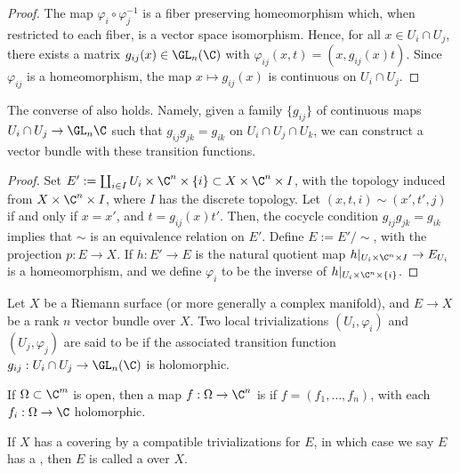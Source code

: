 \documentclass[11pt]{report}
\begin{document}
\begin{proof}
    The map $\varphi_i \circ \varphi_j^{-1}$ is a fiber preserving homeomorphism which, when restricted to each fiber, is a vector space isomorphism. Hence, for all $x \in U_i \cap U_j$, there exists a matrix $g_{ij}(x) \in \GL_n(\C)$ with $\varphi_{ij}(x,t)=(x,g_{ij}(x)t)$. Since $\varphi_{ij}$ is a homeomorphism, the map $x \mapsto g_{ij}(x)$ is continuous on $U_i \cap U_j$.
\end{proof}

\begin{rmk}
    The converse of  also holds. Namely, given a family $\{g_{ij}\}$ of continuous maps $U_i \cap U_j \to \GL_{n}\C$ such that $g_{ij}g_{jk}=g_{ik}$ on $U_i \cap U_j \cap U_k$, we can construct a vector bundle with these transition functions.
\end{rmk}

\begin{proof}
    Set $E':= \coprod_{i \in I}U_i \times \C^n \times \{i\} \subset X \times \C^n \times I$, with the topology induced from $X \times \C^n \times I$, where $I$ has the discrete topology. Let $(x,t,i)\sim (x',t',j)$ if and only if $x=x'$, and $t=g_{ij}(x)t'$. Then, the cocycle condition $g_{ij}g_{jk}=g_{ik}$ implies that $\sim$ is an equivalence relation on $E'$. Define $E:=E'/\sim$, with the projection $p:E \to X$. If $h: E' \to E$ is the natural quotient map $h|_{U_i \times \C^n \times I}\to E_{U_i}$ is a homeomorphism, and we define $\varphi_i$ to be the inverse of $h|_{U_i\times \C^n \times \{i\}}$.
\end{proof}

\begin{defn}
    Let $X$ be a Riemann surface (or more generally a complex manifold), and $E\to X$ be a rank $n$ vector bundle over $X$. Two local trivializations $(U_i, \varphi_i)$ and $(U_j, \varphi_j)$ are said to be  if the associated transition function $g_{ij}:U_i \cap U_j \to \GL_n(\C)$ is holomorphic.
\begin{notethm}[Remark]
    If $\Omega \subset \C^m$ is open, then a map $f: \Omega \to \C^n$ is  if $f=(f_1,\dots,f_n)$, with each $f_i :\Omega \to \C$ holomorphic.
\end{notethm}
If $X$ has a covering by a compatible trivializations for $E$, in which case we say $E$ has a , then $E$ is called a  over $X$.
\end{defn}
\end{document}
